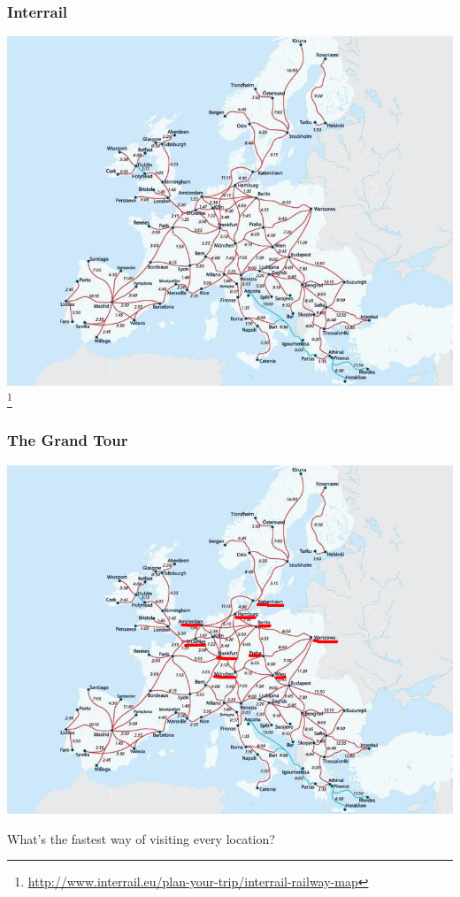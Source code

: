 \documentclass[]{beamer}
\begin{document}
\begin{frame}
\frametitle{Interrail}
\begin{center}
\includegraphics[scale=0.35]{interrail}\footnote{\url{http://www.interrail.eu/plan-your-trip/interrail-railway-map}}
\end{center}
\end{frame}

\begin{frame}
\frametitle{The Grand Tour}
\begin{center}
\includegraphics[scale=0.25]{interrail_selected}
\end{center}
What's the fastest way of visiting every location?
\end{frame}
\end{document}

